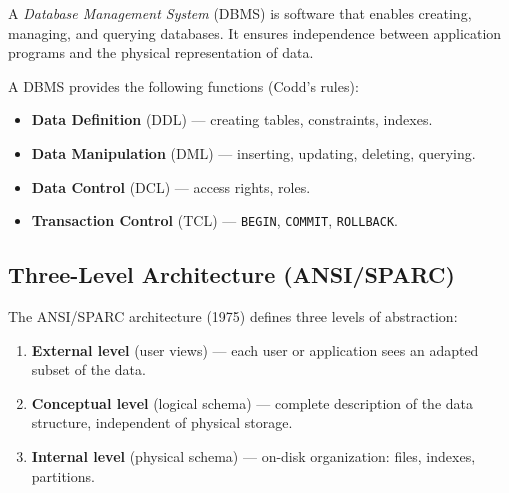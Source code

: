 \begin{definition}[DBMS]
A \emph{Database Management System} (DBMS) is software that enables creating,
managing, and querying databases. It ensures independence between application
programs and the physical representation of data.
\end{definition}

A DBMS provides the following functions (Codd's rules):
\begin{itemize}
    \item \textbf{Data Definition} (DDL) --- creating tables, constraints, indexes.
    \item \textbf{Data Manipulation} (DML) --- inserting, updating, deleting, querying.
    \item \textbf{Data Control} (DCL) --- access rights, roles.
    \item \textbf{Transaction Control} (TCL) --- \texttt{BEGIN}, \texttt{COMMIT}, \texttt{ROLLBACK}.
\end{itemize}

\subsection{Three-Level Architecture (ANSI/SPARC)}

\begin{definition}
The ANSI/SPARC architecture (1975) defines three levels of abstraction:
\begin{enumerate}
    \item \textbf{External level} (user views) --- each user or application
          sees an adapted subset of the data.
    \item \textbf{Conceptual level} (logical schema) --- complete description
          of the data structure, independent of physical storage.
    \item \textbf{Internal level} (physical schema) --- on-disk organization:
          files, indexes, partitions.
\end{enumerate}
\end{definition}

\begin{center}
\end{center}

